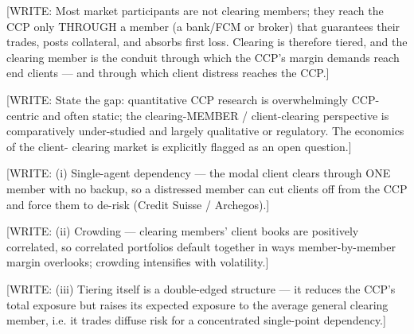 [WRITE: Most market participants are not clearing members; they reach the CCP only
THROUGH a member (a bank/FCM or broker) that guarantees their trades, posts
collateral, and absorbs first loss. Clearing is therefore tiered, and the clearing
member is the conduit through which the CCP's margin demands reach end clients —
and through which client distress reaches the CCP.]
\citep{menkveld_vuillemey_2021}

[WRITE: State the gap: quantitative CCP research is overwhelmingly CCP-centric and
often static; the clearing-MEMBER / client-clearing perspective is comparatively
under-studied and largely qualitative or regulatory. The economics of the client-
clearing market is explicitly flagged as an open question.] \citep{menkveld_vuillemey_2021}

[WRITE: (i) Single-agent dependency — the modal client clears through ONE member
with no backup, so a distressed member can cut clients off from the CCP and force
them to de-risk (Credit Suisse / Archegos).] \citep{ofr_2026}

[WRITE: (ii) Crowding — clearing members' client books are positively correlated,
so correlated portfolios default together in ways member-by-member margin
overlooks; crowding intensifies with volatility.] \citep{huang_menkveld_yu_2021,menkveld_2017}

[WRITE: (iii) Tiering itself is a double-edged structure — it reduces the CCP's
total exposure but raises its expected exposure to the average general clearing
member, i.e. it trades diffuse risk for a concentrated single-point dependency.]
\citep{galbiati_soramaki_2013}

